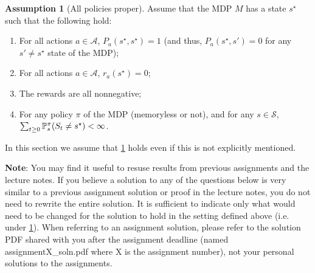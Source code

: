 \documentclass{article}
\DeclareMathOperator*{\1}{\mathbbm{1}}
\theoremstyle{definition}
\newtheorem{assumption}{Assumption}
\theoremstyle{remark}
\newcommand{\cS}{\mathcal{S}}
\newcommand{\cA}{\mathcal{A}}
\begin{document}
\newcommand{\term}{s^{\star}}
\begin{assumption}[All policies proper]\label{ass:app}
Assume that the MDP $M$ has a state $\term$ such that the following hold:
\begin{enumerate}
\item For all actions $a\in \cA$, $P_a(\term,\term)=1$ (and thus, $P_a(\term,s')=0$ for any $s'\ne \term$ state of the MDP);
\item For all actions $a\in \cA$, $r_a(\term)=0$;
\item The rewards are all nonnegative;
\item For any policy $\pi$ of the MDP (memoryless or not), 
and for any $s\in \cS$,
$\sum_{t\ge 0}\PP^{\pi}_s(S_t \ne \term)<\infty$.
\end{enumerate}
\end{assumption}
{\color{red} In this section we assume that \cref{ass:app} holds even if this is not explicitly mentioned.}

\noindent \textbf{Note}: You may find it useful to resuse results from previous assignments and the lecture notes.
If you believe a solution to any of the questions below is very similar to a previous assignment solution or proof in the lecture notes, you do not need to rewrite the entire solution. 
It is sufficient to indicate only what would need to be changed for the solution to hold in the setting defined above (i.e. under \cref*{ass:app}).
When referring to an assignment solution, please refer to the solution PDF shared with you after the assignment deadline (named assignmentX\_soln.pdf where X is the assignment number), not your personal solutions to the assignments.
\end{document}
